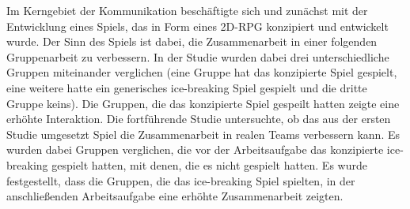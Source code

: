 Im Kerngebiet der Kommunikation beschäftigte sich \cite{nasir_cooperative_2013} und \cite{nasir_effect_2015} zunächst mit der Entwicklung eines  Spiels, das in Form eines 2D-\ac{RPG} konzipiert und entwickelt wurde. Der Sinn des Spiels ist dabei, die Zusammenarbeit in einer folgenden Gruppenarbeit zu verbessern. In der Studie wurden dabei drei unterschiedliche Gruppen miteinander verglichen (eine Gruppe hat das konzipierte Spiel gespielt, eine weitere hatte ein generisches ice-breaking Spiel gespielt und die dritte Gruppe keins). Die Gruppen, die das konzipierte Spiel gespeilt hatten zeigte eine erhöhte Interaktion. Die fortführende Studie untersuchte, ob das aus der ersten Studie umgesetzt Spiel die Zusammenarbeit in realen Teams verbessern kann. Es wurden dabei Gruppen verglichen, die vor der Arbeitsaufgabe das konzipierte ice-breaking gespielt hatten, mit denen, die es nicht gespielt hatten. Es wurde festgestellt, dass die Gruppen, die das ice-breaking Spiel spielten, in der anschließenden Arbeitsaufgabe eine erhöhte Zusammenarbeit zeigten.







